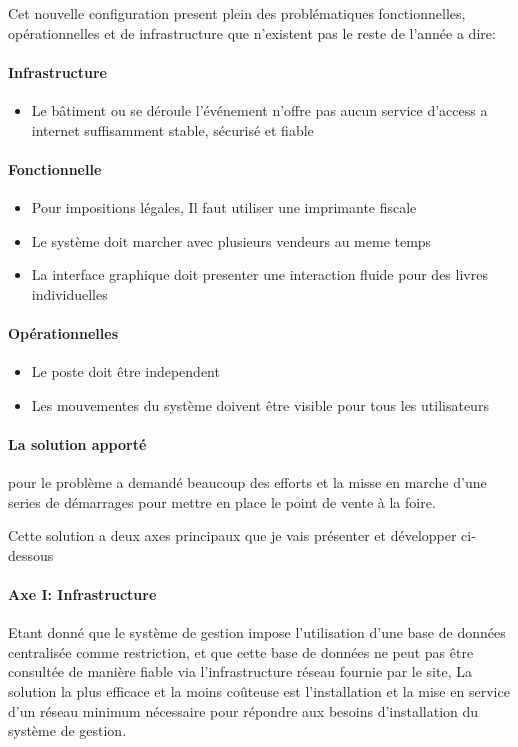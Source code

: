 \documentclass{resume} %
\begin{document}
		Cet nouvelle configuration present plein des problématiques fonctionnelles, opérationnelles et de infrastructure  que n'existent pas le reste de l'année a dire: 

		\paragraph{Infrastructure}
		\begin {itemize} 
			\item Le bâtiment ou se déroule l'événement n'offre pas aucun service d'access a internet suffisamment stable, sécurisé et fiable
		\end {itemize}
		\paragraph{Fonctionnelle}
		\begin {itemize} 
			\item Pour impositions légales, Il faut utiliser une imprimante fiscale 
			\item Le système doit marcher avec plusieurs vendeurs au meme temps
			\item La interface graphique doit presenter une interaction fluide pour des livres individuelles 
		\end {itemize}
		\paragraph{Opérationnelles}
		\begin {itemize} 
			\item Le poste doit être independent 
			\item Les mouvementes du système doivent être visible pour tous les utilisateurs
		\end {itemize}		

		
		
	   \paragraph{La solution apporté} pour le problème a demandé beaucoup des efforts et la misse en marche d'une series de démarrages pour mettre en place le point de vente à la foire.

	       Cette solution a deux axes principaux que je vais présenter et développer ci-dessous

	  	        
		\paragraph{Axe I: Infrastructure}
			Etant donné que le système de gestion impose l'utilisation d'une base de données centralisée comme restriction, et que cette base de données ne peut pas être consultée de manière fiable via l'infrastructure réseau fournie par le site,
La solution la plus efficace et la moins coûteuse est l'installation et la mise en service d'un réseau minimum nécessaire pour répondre aux besoins d'installation du système de gestion.
\end{document}
